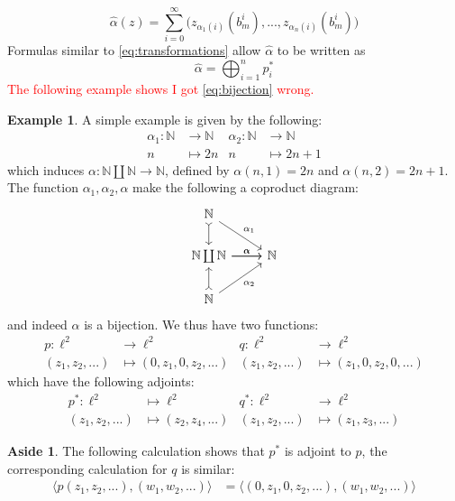 \documentclass[12pt]{article}
\theoremstyle{plain}
\theoremstyle{definition}
\newtheorem{example}[thm]{Example}
\newtheorem{aside}[thm]{Aside}
\newcommand{\bb}[1]{\mathbb{#1}}
\newcommand{\lto}{\longrightarrow}
\begin{document}
\begin{equation}
    \hat{\alpha}(z) = \sum_{i = 0}^\infty \Big(z_{\alpha_1(i)}(b^i_m),...,z_{\alpha_n(i)}(b^i_m)\Big)
\end{equation}
Formulas similar to \eqref{eq:transformations} allow $\hat{\alpha}$ to be written as
\begin{equation}
    \hat{\alpha} = \bigoplus_{i = 1}^n p_i^\ast
\end{equation}
\textcolor{red}{The following example shows I got \eqref{eq:bijection} wrong.}
\begin{example}
A simple example is given by the following:
\begin{align*}
    \alpha_1: \bb{N} &\lto \bb{N} & \alpha_2: \bb{N} &\lto \bb{N}\\
    n &\longmapsto 2n & n &\longmapsto 2n + 1
\end{align*}
which induces $\alpha: \bb{N} \coprod \bb{N} \lto \bb{N}$, defined by $\alpha(n,1) = 2n$ and $\alpha(n,2) = 2n+1$. The function $\alpha_1,\alpha_2,\alpha$ make the following a coproduct diagram:
\begin{equation}
    \begin{tikzcd}
    \bb{N}\arrow[dr,"{\alpha_1}"]\arrow[d,rightarrowtail]\\
    \bb{N}\arrow[r,"{\alpha}"] \coprod \bb{N}\arrow[r,"{\alpha}"] & \bb{N}\\
    \bb{N}\arrow[ur,swap,"{\alpha_2}"]\arrow[u,rightarrowtail]
    \end{tikzcd}
\end{equation}
and indeed $\alpha$ is a bijection. We thus have two functions:
\begin{align*}
    p: \ell^2 & \lto \ell^2 & q: \ell^2 &\lto \ell^2\\
    (z_1,z_2,...) &\longmapsto (0, z_1, 0, z_2, ...) & (z_1,z_2,...) &\longmapsto (z_1, 0, z_2, 0, ...)
\end{align*}
which have the following adjoints:
\begin{align*}
    p^\ast: \ell^2 &\longmapsto \ell^2 & q^\ast: \ell^2 &\lto \ell^2\\
    (z_1,z_2,...) &\longmapsto (z_2,z_4,...) & (z_1,z_2,...) &\longmapsto (z_1,z_3,...)
\end{align*}
\begin{aside}
The following calculation shows that $p^\ast$ is adjoint to $p$, the corresponding calculation for $q$ is similar:
\begin{align*}
    \big\langle p(z_1,z_2,...),(w_1,w_2,...)\big\rangle &= \big\langle (0,z_1,0,z_2,...),(w_1,w_2,...)\big\rangle\\

\end{align*}
\end{aside}
\end{example}
\end{document}
